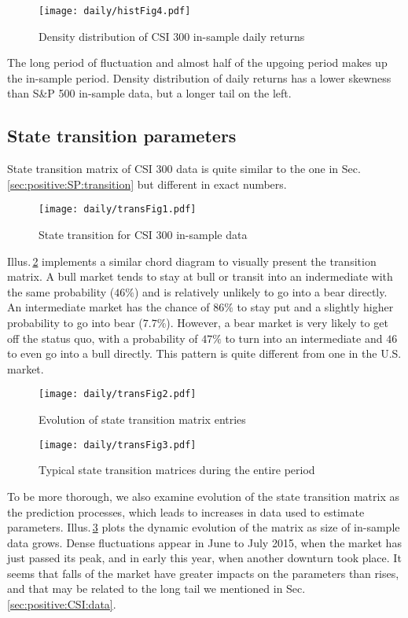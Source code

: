        \begin{figure}[!hbt]
        \center
        \texttt{[image: daily/histFig4.pdf]}
        \caption{Density distribution of CSI 300 in-sample daily returns}
        \label{fig:CSI:ret}
        \end{figure}
The long period of fluctuation and almost half of the upgoing period
makes up the in-sample period.
Density distribution of daily returns has a lower skewness than S\&P 500 in-sample data,
but a longer tail on the left.

\subsection{State transition parameters}
\label{sec:positive:CSI:transition}
State transition matrix of CSI 300 data is quite similar to 
the one in Sec.\,\ref{sec:positive:SP:transition} but different in exact numbers.

        \begin{figure}[!hbt]
        \center
        \texttt{[image: daily/transFig1.pdf]}
        \caption{State transition for CSI 300 in-sample data}
        \label{fig:CSI:transition}
        \end{figure}
Illus.\,\ref{fig:CSI:transition} implements a similar chord diagram to 
visually present the transition matrix.
A bull market tends to stay at bull or transit into an indermediate with the same probability ($46\%$)
and is relatively unlikely to go into a bear directly.
An intermediate market has the chance of $86\%$ to stay put and 
a slightly higher probability to go into bear ($7.7\%$).
However, a bear market is very likely to get off the status quo,
with a probability of $47\%$ to turn into an intermediate and 
$46$ to even go into a bull directly.
This pattern is quite different from one in the U.S. market.

        \begin{figure}[!hbt]
        \center
        \texttt{[image: daily/transFig2.pdf]}
        \caption{Evolution of state transition matrix entries}
        \label{fig:CSI:transitionevo}
        \end{figure}

        \begin{figure}[!hbt]
        \center
        \texttt{[image: daily/transFig3.pdf]}
        \caption{Typical state transition matrices during the entire period }
        \label{fig:CSI:transitiontypical}
        \end{figure}
To be more thorough, we also examine evolution of the state transition matrix
as the prediction processes, which leads to increases in data used to estimate parameters.
Illus.\,\ref{fig:CSI:transitionevo} plots the dynamic evolution of 
the matrix as size of in-sample data grows.
Dense fluctuations appear in June to July 2015, when the market has just passed its peak,
and in early this year, when another downturn took place.
It seems that falls of the market have greater impacts on the parameters than rises,
and that may be related to the long tail we mentioned in Sec.\,\ref{sec:positive:CSI:data}.

